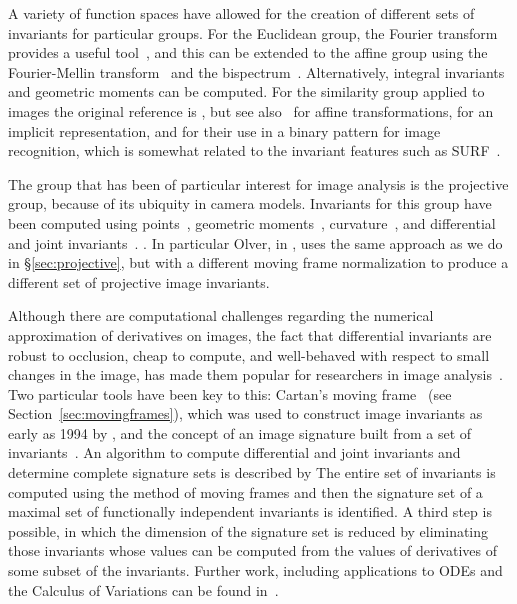 \documentclass{artjlt}
\begin{document}
A variety of function spaces have allowed for the creation of different sets of invariants for particular groups. For the Euclidean group, the Fourier transform provides a useful tool~\citep{Ghorbel1994,Turski2006,Smach2007,Gauthier2008}, and this can be extended to the affine group using the Fourier-Mellin transform~\citep{Reddy1996,Zhang2019} and the bispectrum~\citep{Kakarala2009,Negrinho2013}. Alternatively, integral invariants~\citep{Manay2006,Feng2010} and geometric moments can be computed. For the similarity group applied to images the original reference is \citet{Hu1962}, but see also~\citet{Hickman2011} for affine transformations, \citet{Flusser2009} for an implicit representation, and \citet{Papakostas2013} for their use in a binary pattern for image recognition, which is somewhat related to the invariant features such as SURF~\citep{SURF}.

The group that has been of particular interest for image analysis is the
projective group, because of its ubiquity in camera models. Invariants for
this group have been computed using points~\citep{Gros1992,Suk2000},
geometric moments~\citep{Suk2004}, curvature~\citep{Hann2002a}, and
differential and joint
invariants~\citep{Hubert2007,Arora2009,Kogan2014,Li19}.  . In particular
Olver, in \citet{Olver2020}, uses the same approach as we do in
\S\ref{sec:projective}, but with a different moving frame normalization to
produce a different set of projective image invariants.


Although there are computational challenges regarding the numerical approximation of derivatives on images, the fact that differential invariants are robust to occlusion, cheap to compute, and well-behaved with respect to small changes in the image, has made them popular for researchers in image analysis~\citep{Florack1993}. Two particular tools have been key to this: Cartan's moving frame~\citep{Cartan35} (see Section~\ref{sec:movingframes}), which was used to construct image invariants as early as 1994 by \citet{Faugeras1994}, and the concept of an image signature built from a set of invariants~\citep{Calabi1998}. An algorithm to compute differential and joint invariants and determine complete signature sets is described by \citet{Olver2005,Olver2007}
The entire set of invariants is computed using the method of moving frames and then the signature set of a maximal set of functionally independent invariants is identified. A third step is possible, in which the dimension of the signature set is reduced by eliminating those invariants whose values can be computed from the values of derivatives of some subset of the invariants. Further work, including applications to ODEs and the Calculus of Variations can be found in~\cite{Mansfield}.
\end{document}
